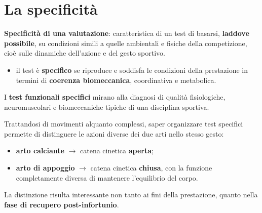 \section{La specificità}

\textbf{Specificità di una valutazione}: caratteristica di un test di basarsi, \textbf{laddove
possibile}, su condizioni simili a quelle ambientali e fisiche della competizione, cioè sulle
dinamiche dell'azione e del gesto sportivo.

\begin{itemize}
  \item il test è \textbf{specifico} se riproduce e soddisfa le condizioni della prestazione in
    termini di \textbf{coerenza biomeccanica}, coordinativa e metabolica.
\end{itemize}

I \textbf{test funzionali specifici} mirano alla diagnosi di qualità fisiologiche, neuromuscolari
e biomeccaniche tipiche di una disciplina sportiva.

Trattandosi di movimenti alquanto complessi, saper organizzare test specifici permette di
distinguere le azioni diverse dei due arti nello stesso gesto:
\begin{itemize}
  \item \textbf{arto calciante} $\rightarrow$ catena cinetica \textbf{aperta};
  \item \textbf{arto di appoggio} $\rightarrow$ catena cinetica \textbf{chiusa}, con la funzione
    completamente diversa di mantenere l'equilibrio del corpo.
\end{itemize}

La distinzione risulta interessante non tanto ai fini della prestazione, quanto nella \textbf{fase
di recupero post-infortunio}.
